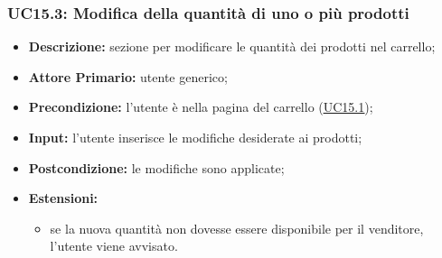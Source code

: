         \subsubsection{UC15.3: Modifica della quantità di uno o più prodotti}
        \begin{itemize}
            \item \textbf{Descrizione:} sezione per modificare le quantità dei prodotti nel carrello;
            \item \textbf{Attore Primario:} utente generico;
            \item \textbf{Precondizione:} l'utente è nella pagina del carrello (\hyperref[sec:UC15.1]{\underline{UC15.1}});
            \item \textbf{Input:} l'utente inserisce le modifiche desiderate ai prodotti;
            \item \textbf{Postcondizione:} le modifiche sono applicate;
            \item \textbf{Estensioni:} 
                \begin{itemize}
                    \item se la nuova quantità non dovesse essere disponibile per il venditore, l'utente viene avvisato.
                \end{itemize}
        \end{itemize}

        
